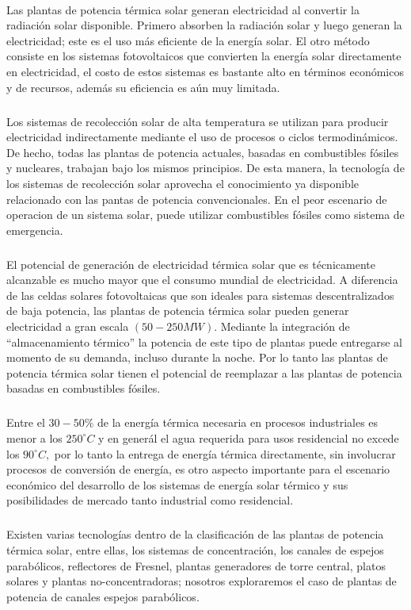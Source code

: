 \documentclass{article}
\theoremstyle{definition} \newtheorem{defi}{Definici\'on}
\theoremstyle{definition} \newtheorem{teo}{Teorema}
\theoremstyle{definition} \newtheorem{cor}{Corolario}
\begin{document}
\paragraph{}
Las plantas de potencia t\'ermica solar generan electricidad al convertir la radiaci\'on solar disponible. Primero absorben la radiaci\'on solar y luego generan la electricidad; este es el uso m\'as eficiente de la energ\'ia solar. El otro m\'etodo consiste en los sistemas fotovoltaicos que convierten la energ\'ia solar directamente en electricidad, el costo de estos sistemas es bastante alto en t\'erminos econ\'omicos y de recursos, adem\'as su eficiencia es a\'un muy limitada.
\subparagraph{}
Los sistemas de recolecci\'on solar de alta temperatura se utilizan para producir electricidad indirectamente mediante el uso de procesos o ciclos termodin\'amicos. De hecho, todas las plantas de potencia actuales, basadas en combustibles f\'osiles y nucleares, trabajan bajo los mismos principios. De esta manera, la tecnolog\'ia de los sistemas de recolecci\'on solar aprovecha el conocimiento ya disponible relacionado con las pantas de potencia convencionales. En el peor escenario de operacion de un sistema solar, puede utilizar combustibles f\'osiles como sistema de emergencia.
\subparagraph{}
El potencial de generaci\'on de electricidad t\'ermica solar que es t\'ecnicamente alcanzable es mucho mayor que el consumo mundial de electricidad. A diferencia de las celdas solares fotovoltaicas que son ideales para sistemas descentralizados de baja potencia, las plantas de potencia t\'ermica solar pueden generar electricidad a gran escala $(50 - 250 MW).$ Mediante la integraci\'on de ``almacenamiento t\'ermico'' la potencia de este tipo de plantas puede entregarse al momento de su demanda, incluso durante la noche. Por lo tanto las plantas de potencia t\'ermica solar tienen el potencial de reemplazar a las plantas de potencia basadas en combustibles f\'osiles.
\subparagraph{}
Entre el $30-50\%$ de la energ\'ia t\'ermica necesaria en procesos industriales es menor a los $250^\circ C$ y en gener\'al el agua requerida para usos residencial no excede los $90^\circ C,$ por lo tanto la entrega de energ\'ia t\'ermica directamente, sin involucrar procesos de conversi\'on de energ\'ia, es otro aspecto importante para el escenario econ\'omico del desarrollo de los sistemas de energ\'ia solar t\'ermico y sus posibilidades de mercado tanto industrial como residencial.
\subparagraph{}
Existen varias tecnolog\'ias dentro de la clasificaci\'on de las plantas de potencia t\'ermica solar, entre ellas, los sistemas de concentraci\'on, los canales de espejos parab\'olicos, reflectores de Fresnel, plantas generadores de torre central, platos solares y plantas no-concentradoras; nosotros exploraremos el caso de plantas de potencia de canales espejos parab\'olicos.
\end{document}
